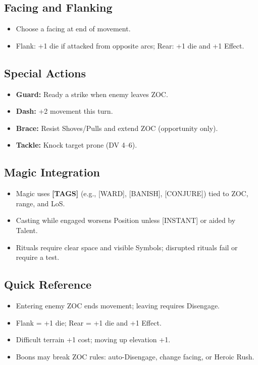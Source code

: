 \subsection{Facing and Flanking}
\begin{itemize}
  \item Choose a facing at end of movement.
  \item Flank: +1 die if attacked from opposite arcs; Rear: +1 die and +1 Effect.
\end{itemize}

\subsection{Special Actions}
\begin{itemize}
  \item \textbf{Guard:} Ready a strike when enemy leaves ZOC.
  \item \textbf{Dash:} +2 movement this turn.
  \item \textbf{Brace:} Resist Shoves/Pulls and extend ZOC (opportunity only).
  \item \textbf{Tackle:} Knock target prone (DV 4–6).
\end{itemize}

\subsection{Magic Integration}
\begin{itemize}
  \item Magic uses \textbf{[TAGS]} (e.g., [WARD], [BANISH], [CONJURE]) tied to ZOC, range, and LoS.
  \item Casting while engaged worsens Position unless [INSTANT] or aided by Talent.
  \item Rituals require clear space and visible Symbols; disrupted rituals fail or require a test.
\end{itemize}

\subsection{Quick Reference}
\begin{itemize}
  \item Entering enemy ZOC ends movement; leaving requires Disengage.
  \item Flank = +1 die; Rear = +1 die and +1 Effect.
  \item Difficult terrain +1 cost; moving up elevation +1.
  \item Boons may break ZOC rules: auto-Disengage, change facing, or Heroic Rush.
\end{itemize}

